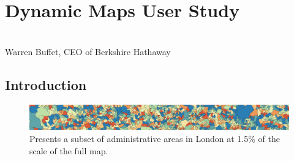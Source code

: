 \chapter{Dynamic Maps User Study}
\label{chap:userStudy}

 \cite{mcnabb2018when}  \\

{Warren Buffet, CEO of Berkshire Hathaway}

\newpage
{\footnotesize \hypersetup{linkcolor=black}
\minitoc}


\newpage

\section{Introduction} \label{sec:introduction}
 \begin{figure}[ht]
  \centering
  \includegraphics[width=\linewidth]{images/CypressView2}
  \caption{Presents a subset of administrative areas in London at 1.5\% of the scale of the full map.}
	\label{fig:teaser}
\end{figure}

